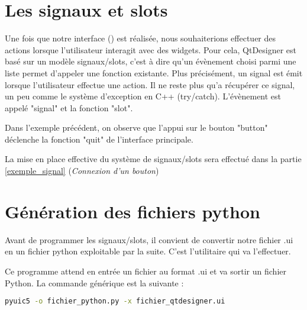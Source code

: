 {\section{Les signaux et slots}

Une fois que notre interface () est réalisée, nous souhaiterions effectuer des actions lorsque l'utilisateur interagit avec des widgets. \newline \newline
Pour cela, QtDesigner est basé sur un modèle signaux/slots, c'est à dire qu'un évènement choisi parmi une liste permet d'appeler une fonction existante. \newline
Plus précisément, un signal est émit lorsque l'utilisateur effectue une action. Il ne reste plus qu'a récupérer ce signal, un peu comme le système d'exception en C++ (try/catch).
L'évènement est appelé "signal" et la fonction "slot". \newline \newline



Dans l'exemple précédent, on observe que l'appui sur le bouton "button" déclenche la fonction "quit" de l'interface principale.

La mise en place effective du système de signaux/slots sera effectué dans la partie  \ref{exemple_signal} (\textit{Connexion d'un bouton})

\section{Génération des fichiers python}

Avant de programmer les signaux/slots, il convient de convertir notre fichier .ui en un fichier python exploitable par la suite. C'est l'utilitaire  qui va l'effectuer. \newline

Ce programme attend en entrée un fichier au format .ui et va sortir un fichier Python. La commande générique est la suivante : 

\begin{lstlisting}[language=bash]
pyuic5 -o fichier_python.py -x fichier_qtdesigner.ui
\end{lstlisting}

}
